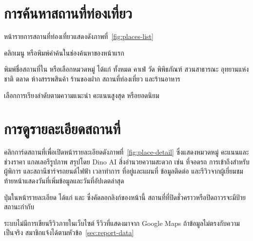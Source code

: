 \label{ch:tourist}

\section{การค้นหาสถานที่ท่องเที่ยว}
\label{sec:search-places}

หน้ารายการสถานที่ท่องเที่ยวแสดงดังภาพที่~\ref{fig:places-list}


\begin{steps}
  \item คลิกเมนู  หรือพิมพ์คำค้นในช่องค้นหาของหน้าแรก
  \item พิมพ์ชื่อสถานที่ใน  หรือเลือกหมวดหมู่ ได้แก่ ทั้งหมด คาเฟ่ วัด พิพิธภัณฑ์ สวนสาธารณะ อุทยานแห่งชาติ ตลาด ห้างสรรพสินค้า ร้านของฝาก สถานที่ท่องเที่ยว และร้านอาหาร
  \item เลือกการเรียงลำดับตามความแนะนำ คะแนนสูงสุด หรือยอดนิยม
\end{steps}

\section{การดูรายละเอียดสถานที่}

คลิกการ์ดสถานที่เพื่อเปิดหน้ารายละเอียดดังภาพที่~\ref{fig:place-detail} ซึ่งแสดงหมวดหมู่ คะแนนและช่วงราคา แกลเลอรีรูปภาพ สรุปโดย Dino AI สิ่งอำนวยความสะดวก เช่น ที่จอดรถ การเข้าถึงสำหรับผู้พิการ และสถานีชาร์จรถยนต์ไฟฟ้า เวลาทำการ ที่อยู่และแผนที่ ข้อมูลติดต่อ และรีวิวจากผู้เยี่ยมชม ท้ายหน้าแสดงวันที่เพิ่มข้อมูลและวันที่อัปเดตล่าสุด


ปุ่มในหน้ารายละเอียด ได้แก่    และ  ซึ่งคัดลอกลิงก์ของหน้านี้ สถานที่ที่ปิดชั่วคราวหรือปิดถาวรจะมีป้ายสถานะกำกับ

\begin{note}
ระบบไม่มีการเขียนรีวิวภายในเว็บไซต์ รีวิวที่แสดงมาจาก Google Maps ถ้าข้อมูลไม่ตรงกับความเป็นจริง สมาชิกแจ้งได้ตามหัวข้อ~\ref{sec:report-data}
\end{note}

